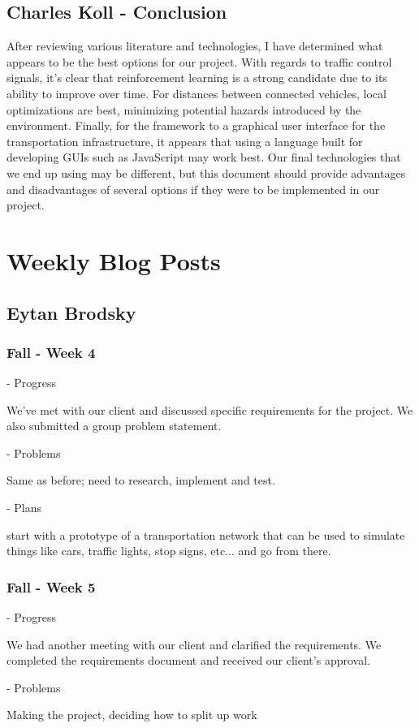 \documentclass[onecolumn, draftclsnofoot,10pt, compsoc]{IEEEtran}
\begin{document}
\subsection{Charles Koll - Conclusion}
After reviewing various literature and technologies, I have determined what appears to be the best options for our project.
With regards to traffic control signals, it’s clear that reinforcement learning is a strong candidate due to its ability to improve over time.
For distances between connected vehicles, local optimizations are best, minimizing potential hazards introduced by the environment.
Finally, for the framework to a graphical user interface for the transportation infrastructure, it appears that using a language built for developing GUIs such as JavaScript may work best.
Our final technologies that we end up using may be different, but this document should provide advantages and disadvantages of several options if they were to be implemented in our project.
\newpage
\section{Weekly Blog Posts}
\subsection{Eytan Brodsky}
\subsubsection{Fall - Week 4}
- Progress

We've met with our client and discussed specific requirements for the project.
We also submitted a group problem statement.

- Problems

Same as before; need to research, implement and test.

- Plans

start with a prototype of a transportation network that can be used to simulate things like cars, traffic lights, stop signs, etc... and go from there.
\subsubsection{Fall - Week 5}
- Progress

We had another meeting with our client and clarified the requirements.
We completed the requirements document and received our client's approval.

- Problems

Making the project, deciding how to split up work
\end{document}
